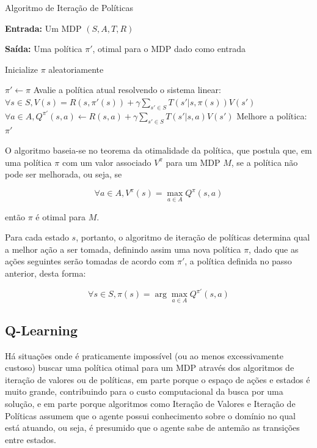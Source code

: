 \documentclass[cic,tc]{iiufrgs}
\begin{document}
\begin{algorithm}
\label{policy_iteration_alg}
\caption{Algoritmo de Iteração de Políticas}

\textbf{Entrada:}  Um MDP $(S, A, T, R)$


\textbf{Saída:} Uma política $\pi'$, otimal para o MDP dado como entrada


\begin{algorithmic}[1]
  \State Inicialize $\pi$ aleatoriamente

  \Repeat
    \State $\pi' \gets \pi$
    \State Avalie a política atual resolvendo o sistema linear:
    \State $\forall s \in S, V(s) = R(s, \pi'(s)) + \gamma\sum_{s' \in S}
    T(s'|s, \pi(s))V(s')$
      \State $\forall a \in A, Q^{\pi'}(s, a) \gets R(s, a) + \gamma
      \sum_{s' \in S}T(s' |s, a)V(s')$
    \EndFor
      \State Melhore a política:
    \EndFor
  \State \Return $\pi'$
\EndFunction
\end{algorithmic}
\end{algorithm}

O algoritmo baseia-se no teorema da otimalidade da política, que postula que,
em uma política $\pi$ com um valor associado $V^\pi$ para um MDP $M$, se a
política não pode ser melhorada, ou seja, se

$$
\forall a \in A, V^\pi(s) = \max_{a \in A}Q^\pi(s, a)
$$

então $\pi$ é otimal para $M$.

Para cada estado $s$, portanto, o algoritmo de iteração de políticas determina
qual a melhor ação a ser tomada, definindo assim uma nova política $\pi$, dado
que as ações seguintes serão tomadas de acordo com $\pi'$, a política definida
no passo anterior, desta forma:

\begin{equation}
  \forall s \in S, \pi(s) = \arg \max_{a \in A}Q^{\pi'}(s, a)
\end{equation}


\subsection{Q-Learning}
Há situações onde é praticamente impossível (ou ao menos excessivamente custoso)
buscar uma política otimal para um MDP através dos algoritmos de iteração de
valores ou de políticas, em parte porque o espaço de ações e estados é
muito grande, contribuindo para o custo computacional da busca por uma solução,
e em parte porque algoritmos como Iteração de Valores e Iteração de Políticas
assumem que o agente possui conhecimento sobre o domínio no qual está atuando,
ou seja, é presumido que o agente sabe de antemão as transições entre estados.
\end{document}
